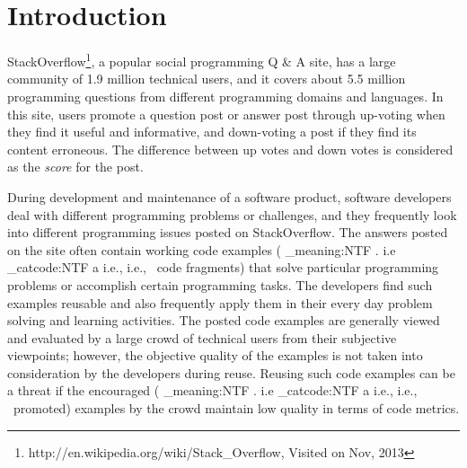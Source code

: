\documentclass{sig-alternate}
\makeatletter
\newcommand\latinabbrev[1]{
  \peek_meaning:NTF . {%
    #1\@}%
  { \peek_catcode:NTF a {%
      #1., \@ }%
    {#1., \@}}}
\def\ie{\latinabbrev{i.e}}
\makeatother
\begin{document}


\section{Introduction}
StackOverflow\footnote{http://en.wikipedia.org/wiki/Stack\_Overflow, Visited on Nov, 2013}, a popular social programming Q \& A site,  has a large community of 1.9 million technical users, and it covers about 5.5 million programming questions from different programming domains and languages. In this site, users promote a question post or answer post through up-voting when they find it useful and informative, and down-voting a post if they find its content erroneous. The difference between up votes and down votes is considered as the \emph{score} for the post. 

During development and maintenance of a software product, software developers deal with different programming problems or challenges, and they frequently look into different programming issues posted on StackOverflow. The answers posted on the site often contain working code examples (\ie\ code fragments) that solve particular programming problems or accomplish certain programming tasks. The developers find such examples reusable and also frequently apply them in their every day problem solving and learning activities. The posted code examples are generally viewed and evaluated by a large crowd of technical users from their subjective viewpoints; however, the objective quality of the examples is not taken into consideration by the developers during reuse. Reusing such code examples can be a threat if the encouraged (\ie\ promoted) examples by the crowd maintain low quality in terms of code metrics.
\end{document}
